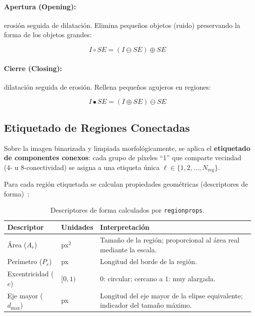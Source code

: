 \documentclass[12pt,a4paper]{article}
\begin{document}
\paragraph{Apertura (Opening):} erosión seguida de dilatación.  Elimina
pequeños objetos (ruido) preservando la forma de los objetos grandes:

\begin{equation}
	\boxed{I \circ SE = (I \ominus SE) \oplus SE}
	\label{eq:opening}
\end{equation}

\paragraph{Cierre (Closing):} dilatación seguida de erosión.  Rellena
pequeños agujeros en regiones:

\begin{equation}
	I \bullet SE = (I \oplus SE) \ominus SE
	\label{eq:closing}
\end{equation}

\subsection{Etiquetado de Regiones Conectadas}
\label{subsec:etiquetado}

Sobre la imagen binarizada y limpiada morfológicamente, se aplica el
\textbf{etiquetado de componentes conexos}: cada grupo de píxeles
``1'' que comparte vecindad (4- u 8-conectividad) se asigna a una
etiqueta única $\ell \in \{1, 2, \ldots, N_\mathrm{reg}\}$.

Para cada región etiquetada se calculan propiedades geométricas
(descriptores de forma)~\cite{russ2016}:

\begin{table}[H]
	\centering
	\caption{Descriptores de forma calculados por \texttt{regionprops}.}
	\label{tab:descriptores}
	\begin{tabularx}{\textwidth}{l l X}
		\toprule
		\textbf{Descriptor}          & \textbf{Unidades} & \textbf{Interpretación}             \\
		\midrule
		Área ($A_r$)                 & px$^2$            & Tamaño de la región; proporcional
		al área real mediante la escala.                                                       \\
		Perímetro ($P_r$)            & px                & Longitud del borde de la región.    \\
		Excentricidad ($e$)          & $[0,1)$           & $0$: circular; cercano a $1$:
		muy alargada.                                                                          \\
		Eje mayor ($d_\mathrm{max}$) & px                & Longitud del eje mayor de la elipse
		equivalente; indicador del tamaño máximo.                                              \\
		\bottomrule
	\end{tabularx}
\end{table}
\end{document}
